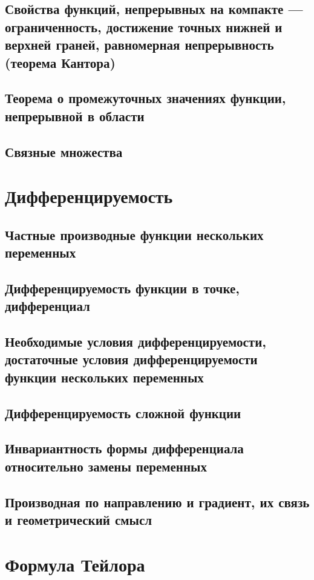 \documentclass{article}
\begin{document}
\subsection{Свойства функций, непрерывных на компакте — ограниченность, достижение точных нижней и верхней граней, равномерная непрерывность (теорема Кантора)}
\subsection{Теорема о промежуточных значениях функции, непрерывной в области}
\subsection{Связные множества}


\section{Дифференцируемость}
\subsection{Частные производные функции нескольких переменных}
\subsection{Дифференцируемость функции в точке, дифференциал}
\subsection{Необходимые условия дифференцируемости, достаточные условия дифференцируемости функции нескольких переменных}
\subsection{Дифференцируемость сложной функции}
\subsection{Инвариантность формы дифференциала относительно замены переменных}
\subsection{Производная по направлению и градиент, их связь и геометрический смысл}



\section{Формула Тейлора}
\end{document}
